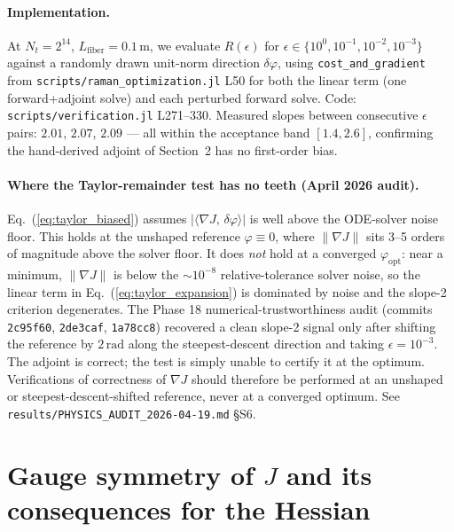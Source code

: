 \documentclass[11pt]{article}
\begin{document}
\paragraph{Implementation.} At $N_t = 2^{14}$, $L_\text{fiber} = 0.1\,\mathrm{m}$,
we evaluate $R(\epsilon)$ for $\epsilon \in \{10^0, 10^{-1}, 10^{-2}, 10^{-3}\}$
against a randomly drawn unit-norm direction $\delta\varphi$, using
\texttt{cost\_and\_gradient} from \texttt{scripts/raman\_optimization.jl} L50
for both the linear term (one forward+adjoint solve) and each perturbed forward
solve. Code: \texttt{scripts/verification.jl} L271--330. Measured slopes
between consecutive $\epsilon$ pairs: $2.01$, $2.07$, $2.09$ — all within the
acceptance band $[1.4, 2.6]$, confirming the hand-derived adjoint of Section~2
has no first-order bias.

\paragraph{Where the Taylor-remainder test has no teeth (April 2026 audit).}
Eq.~(\ref{eq:taylor_biased}) assumes $|\langle \nabla J,\,\delta\varphi\rangle|$
is well above the ODE-solver noise floor. This holds at the unshaped
reference $\varphi \equiv 0$, where $\|\nabla J\|$ sits 3--5 orders of
magnitude above the solver floor. It does \emph{not} hold at a converged
$\varphi_\text{opt}$: near a minimum, $\|\nabla J\|$ is below the
$\sim 10^{-8}$ relative-tolerance solver noise, so the linear term in
Eq.~(\ref{eq:taylor_expansion}) is dominated by noise and the slope-2
criterion degenerates. The Phase 18 numerical-trustworthiness audit
(commits \texttt{2c95f60}, \texttt{2de3caf}, \texttt{1a78cc8}) recovered
a clean slope-2 signal only after shifting the reference by
$2\,\mathrm{rad}$ along the steepest-descent direction and taking
$\epsilon = 10^{-3}$. The adjoint is correct; the test is simply
unable to certify it at the optimum. Verifications of correctness of
$\nabla J$ should therefore be performed at an unshaped or
steepest-descent-shifted reference, never at a converged optimum.
See \texttt{results/PHYSICS\_AUDIT\_2026-04-19.md} §S6.

\section{Gauge symmetry of $J$ and its consequences for the Hessian}
\label{sec:gauge}
\end{document}

